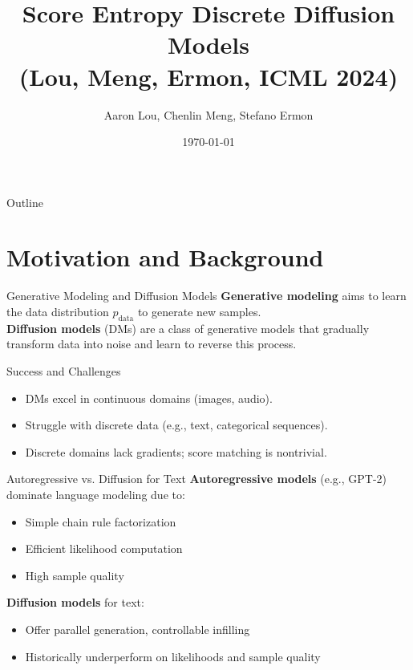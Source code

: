 \documentclass{beamer}
\title[Score Entropy Discrete Diffusion]{Score Entropy Discrete Diffusion Models\\ \small{(Lou, Meng, Ermon, ICML 2024)}}
\author{Aaron Lou, Chenlin Meng, Stefano Ermon}
\institute{Stanford University}
\date{\today}
\begin{document}
\begin{frame}
  \titlepage
\end{frame}

\begin{frame}{Outline}
  \tableofcontents
\end{frame}

\section{Motivation and Background}

\begin{frame}{Generative Modeling and Diffusion Models}
  \textbf{Generative modeling} aims to learn the data distribution $p_{\text{data}}$ to generate new samples.\\[1em]
  \textbf{Diffusion models} (DMs) are a class of generative models that gradually transform data into noise and learn to reverse this process.
  \vspace{1em}
  \begin{block}{Success and Challenges}
    \begin{itemize}
      \item DMs excel in continuous domains (images, audio).
      \item Struggle with discrete data (e.g., text, categorical sequences).
      \item Discrete domains lack gradients; score matching is nontrivial.
    \end{itemize}
  \end{block}
\end{frame}

\begin{frame}{Autoregressive vs. Diffusion for Text}
  \textbf{Autoregressive models} (e.g., GPT-2) dominate language modeling due to:
  \begin{itemize}
    \item Simple chain rule factorization
    \item Efficient likelihood computation
    \item High sample quality
  \end{itemize}
  \vspace{1em}
  \textbf{Diffusion models} for text:
  \begin{itemize}
    \item Offer parallel generation, controllable infilling
    \item Historically underperform on likelihoods and sample quality
  \end{itemize}
\end{frame}
\end{document}
